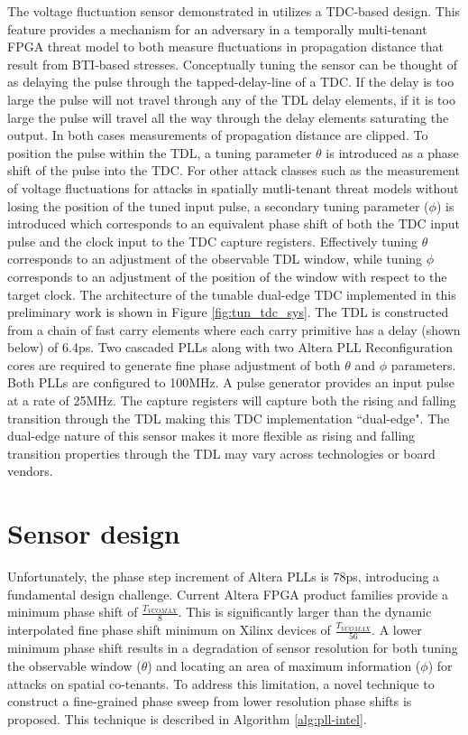 The voltage fluctuation sensor demonstrated in
\cite{drewes2024pentimento} utilizes a TDC-based design. This feature
provides a mechanism for an adversary in a temporally multi-tenant FPGA
threat model to both measure fluctuations in propagation distance that
result from BTI-based stresses. Conceptually tuning the sensor can be
thought of as delaying the pulse through the tapped-delay-line of a TDC.
If the delay is too large the pulse will not travel through any of the
TDL delay elements, if it is too large the pulse will travel all the way
through the delay elements saturating the output. In both cases
measurements of propagation distance are clipped. To position the pulse
within the TDL, a tuning parameter $\theta$ is introduced as a phase
shift of the pulse into the TDC. For other attack classes such as the
measurement of voltage fluctuations for attacks in spatially
mutli-tenant threat models without losing the position of the tuned
input pulse, a secondary tuning parameter ($\phi$) is introduced which
corresponds to an equivalent phase shift of both the TDC input pulse and
the clock input to the TDC capture registers. Effectively tuning
$\theta$ corresponds to an adjustment of the observable TDL window,
while tuning $\phi$ corresponds to an adjustment of the position of the
window with respect to the target clock. The architecture of the tunable
dual-edge TDC implemented in this preliminary work is shown in Figure
\ref{fig:tun_tdc_sys}. The TDL is constructed from a chain of fast carry
elements where each carry primitive has a delay (shown below) of 6.4ps.
Two cascaded PLLs along with two Altera PLL Reconfiguration cores are
required to generate fine phase adjustment of both $\theta$ and $\phi$
parameters. Both PLLs are configured to 100MHz. A pulse generator
provides an input pulse at a rate of 25MHz. The capture registers will
capture both the rising and falling transition through the TDL making
this TDC implementation ``dual-edge". The dual-edge nature of this
sensor makes it more flexible as rising and falling transition
properties through the TDL may vary across technologies or board
vendors.

\section{Sensor design} Unfortunately, the phase step increment of Altera PLLs is 78ps,
introducing a fundamental design challenge. Current Altera FPGA product
families provide a minimum phase shift of $\frac{T_{VCOMAX}}{8}$. This
is significantly larger than the dynamic interpolated fine phase shift
minimum on Xilinx devices of $\frac{T_{VCOMAX}}{56}$. A lower minimum
phase shift results in a degradation of sensor resolution for both
tuning the observable window ($\theta$) and locating an area of maximum
information ($\phi$) for attacks on spatial co-tenants. To address this
limitation, a novel technique to construct a fine-grained phase sweep
from lower resolution phase shifts is proposed. This technique is
described in Algorithm \ref{alg:pll-intel}.

